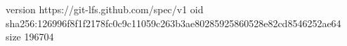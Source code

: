 version https://git-lfs.github.com/spec/v1
oid sha256:126996f8f1f2178fc0c9c11059c263b3ae80285925860528e82cd8546252ae64
size 196704

